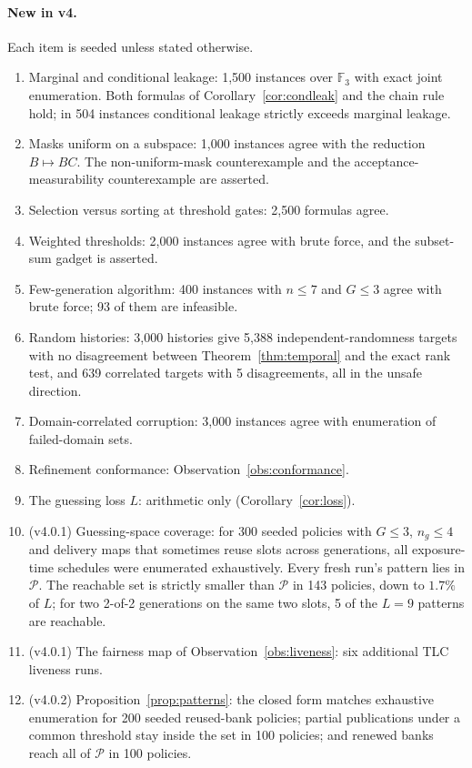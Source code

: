 \documentclass[pdflatex,sn-mathphys-num,twocolumn]{sn-jnl}
\theoremstyle{plain}
\theoremstyle{definition}
\newcommand{\F}{\mathbb{F}}
\begin{document}
\paragraph{New in v4.}
Each item is seeded unless stated otherwise.
\begin{enumerate}
\item Marginal and conditional leakage: 1,500 instances over $\F_3$ with exact joint enumeration. Both formulas of Corollary~\ref{cor:condleak} and the chain rule hold; in 504 instances conditional leakage strictly exceeds marginal leakage.
\item Masks uniform on a subspace: 1,000 instances agree with the reduction $B\mapsto BC$. The non-uniform-mask counterexample and the acceptance-measurability counterexample are asserted.
\item Selection versus sorting at threshold gates: 2,500 formulas agree.
\item Weighted thresholds: 2,000 instances agree with brute force, and the subset-sum gadget is asserted.
\item Few-generation algorithm: 400 instances with $n\le7$ and $G\le3$ agree with brute force; 93 of them are infeasible.
\item Random histories: 3,000 histories give 5,388 independent-randomness targets with no disagreement between Theorem~\ref{thm:temporal} and the exact rank test, and 639 correlated targets with 5 disagreements, all in the unsafe direction.
\item Domain-correlated corruption: 3,000 instances agree with enumeration of failed-domain sets.
\item Refinement conformance: Observation~\ref{obs:conformance}.
\item The guessing loss $L$: arithmetic only (Corollary~\ref{cor:loss}).
\item (v4.0.1) Guessing-space coverage: for 300 seeded policies with $G\le3$, $n_g\le4$ and delivery maps that sometimes reuse slots across generations, all exposure-time schedules were enumerated exhaustively. Every fresh run's pattern lies in $\mathcal P$. The reachable set is strictly smaller than $\mathcal P$ in 143 policies, down to $1.7\%$ of $L$; for two 2-of-2 generations on the same two slots, 5 of the $L=9$ patterns are reachable.
\item (v4.0.1) The fairness map of Observation~\ref{obs:liveness}: six additional TLC liveness runs.
\item (v4.0.2) Proposition~\ref{prop:patterns}: the closed form matches exhaustive enumeration for 200 seeded reused-bank policies; partial publications under a common threshold stay inside the set in 100 policies; and renewed banks reach all of $\mathcal P$ in 100 policies.

\end{enumerate}
\end{document}
